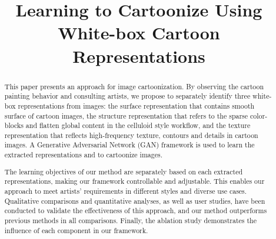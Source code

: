 \documentclass[10pt,twocolumn,letterpaper]{article}
\begin{document}


\title{Learning to Cartoonize Using White-box Cartoon Representations}
\maketitle
\begin{abstract}

This paper presents an approach for image cartoonization. By observing the cartoon painting behavior and consulting artists, we propose to separately identify three white-box representations from images: the surface representation that contains smooth surface of cartoon images, the structure representation that refers to the sparse color-blocks and flatten global content in the celluloid style workflow, and the texture representation that reflects high-frequency texture, contours and details in cartoon images. A Generative Adversarial Network (GAN) framework is used to learn the extracted representations and to cartoonize images. 

The learning objectives of our method are separately based on each extracted representations, making our framework controllable and adjustable. This enables our approach to meet artists' requirements in different styles and diverse use cases. Qualitative comparisons and quantitative analyses, as well as user studies, have been conducted to validate the effectiveness of this approach, and our method outperforms previous methods in all comparisons. Finally, the ablation study demonstrates the influence of each component in our framework. 

\end{abstract}
\vspace{-1em}
\end{document}
